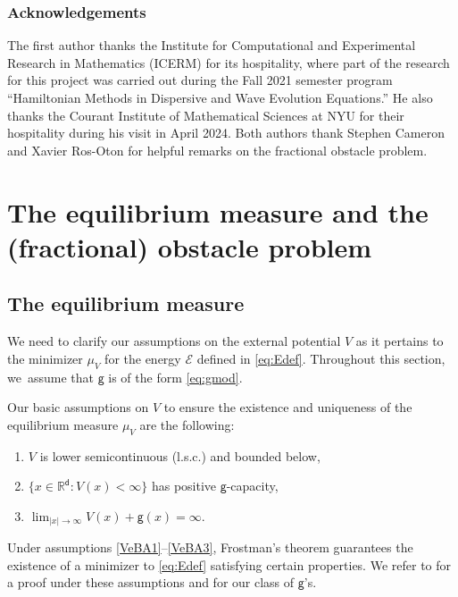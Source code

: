 \documentclass[JEP,XML,SOM,Unicode,published]{cedram}
\newenvironment{enumeratei}
{\bgroup\def\theenumi{\roman{enumi}}\def\theenumii{\arabic{enumii}}\begin{enumerate}}
{\end{enumerate}\egroup}
\theoremstyle{plain}
\theoremstyle{definition}
\newcommand{\R}{{\mathbb{R}}}
\newcommand{\Ec}{\mathcal{E}}
\renewcommand{\d}{\mathsf{d}}
\newcommand{\g}{{\mathsf{g}}}
\begin{document}
\subsubsection*{Acknowledgements}
The first author thanks the Institute for Computational and Experimental Research in Mathematics (ICERM) for its hospitality, where part of the research for this project was carried out during the Fall 2021 semester program ``Hamiltonian Methods in Dispersive and Wave Evolution Equations.'' He also thanks the Courant Institute of Mathematical Sciences at NYU for their hospitality during his visit in April 2024.
Both authors thank Stephen Cameron and Xavier Ros-Oton for helpful remarks on the fractional obstacle problem.

\section{The equilibrium measure and the (fractional) obstacle problem}\label{sec:EMOP}

\subsection{The equilibrium measure}\label{ssec:EMOPem}
We need to clarify our assumptions on the external potential $V$ as it pertains to the minimizer $\mu_V$ for the energy $\Ec$ defined in \eqref{eq:Edef}. Throughout this section, we~assume that $\g$ is of the form \eqref{eq:gmod}.

Our basic assumptions on $V$ to ensure the existence {and uniqueness} of the equilibrium measure $\mu_V$ are the following:
\begin{enumeratei}
\item\label{VeBA1} $V$ is lower semicontinuous (l.s.c.) and bounded below,
\item\label{VeBA2} $\{x\in\R^\d: V(x)<\infty\}$ has positive $\g$-capacity,
\item\label{VeBA3} {$\lim_{|x|\to\infty} V(x) +\g(x) = \infty$.}
\end{enumeratei}

Under assumptions \eqref{VeBA1}--\eqref{VeBA3}, Frostman's theorem \cite{Frostman1935} guarantees the existence of a minimizer to \eqref{eq:Edef} satisfying certain properties. {We refer to \cite[Chap.\,2]{SerfatyLN} for a proof under these assumptions and for our class of $\g$'s. }
\end{document}
